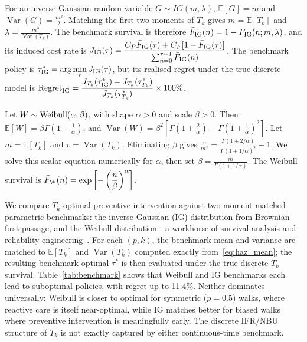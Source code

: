\documentclass[pdflatex,sn-mathphys-num]{sn-jnl}
\theoremstyle{definition}
\DeclareMathOperator{\Var}{Var}
\newcommand{\E}{\mathbb{E}}
\numberwithin{equation}{section}
\begin{document}
For an inverse-Gaussian random variable \(G\sim IG(m,\lambda)\),
$\displaystyle \E[G]=m$ and
$\displaystyle \Var(G)=\frac{m^3}{\lambda}$.
Matching the first two moments of \(T_k\) gives
$\displaystyle m=\E[T_k]$ and
$\displaystyle \lambda=\frac{m^3}{\Var(T_k)}$.
The benchmark survival is therefore
$\bar F_{\rm IG}(n)
=
1-F_{\rm IG}(n;m,\lambda)$,
and its induced cost rate is
$\displaystyle J_{\rm IG}(\tau)
=
\frac{
C_P\bar F_{\rm IG}(\tau)+C_F[1-\bar F_{\rm IG}(\tau)]
}{
\sum_{n=0}^{\tau-1}\bar F_{\rm IG}(n)
}$.
The benchmark policy is
$\displaystyle \tau^*_{\rm IG}=\arg\min_\tau J_{\rm IG}(\tau)$,
but its realised regret under the true discrete model is
$\displaystyle {\rm Regret}_{\rm IG}
=
\frac{
J_{T_k}(\tau^*_{\rm IG})-J_{T_k}(\tau^*_{T_k})
}{
J_{T_k}(\tau^*_{T_k})
}\times 100\%$.

Let \(W\sim{\rm Weibull}(\alpha,\beta)\), with shape \(\alpha>0\) and scale
\(\beta>0\). Then
$\displaystyle \E[W]=\beta\Gamma\left(1+\frac1\alpha\right)$,
and
$\displaystyle \Var(W)
=
\beta^2
\left[
\Gamma\left(1+\frac2\alpha\right)
-
\Gamma\left(1+\frac1\alpha\right)^2
\right]$.
Let \(m=\E[T_k]\) and \(v=\Var(T_k)\). Eliminating \(\beta\) gives
$\displaystyle \frac{v}{m^2}
=
\frac{
\Gamma(1+2/\alpha)
}{
\Gamma(1+1/\alpha)^2
}
-1$.
We solve this scalar equation numerically for \(\alpha\), then set
$\displaystyle \beta
=
\frac{m}{\Gamma(1+1/\alpha)}$.
The Weibull survival is
$\displaystyle \bar F_{\rm W}(n)
=
\exp\left[-\left(\frac{n}{\beta}\right)^\alpha\right]$.

We compare $T_k$-optimal preventive intervention against two moment-matched parametric benchmarks: the inverse-Gaussian (IG) distribution from Brownian first-passage, and the Weibull distribution---a workhorse of survival analysis and reliability engineering~\cite{murthy2004weibull}. For each $(p,k)$, the benchmark mean and variance are matched to $\E[T_k]$ and $\Var(T_k)$ computed exactly from~\eqref{eq:haz_mean}; the resulting benchmark-optimal $\tau^*$ is then evaluated under the true discrete $T_k$ survival. Table~\ref{tab:benchmark} shows that Weibull and IG benchmarks each lead to suboptimal policies, with regret up to 11.4\%. Neither dominates universally: Weibull is closer to optimal for symmetric ($p=0.5$) walks, where reactive care is itself near-optimal, while IG matches better for biased walks where preventive intervention is meaningfully early. The discrete IFR/NBU structure of $T_k$ is not exactly captured by either continuous-time benchmark.
\end{document}

